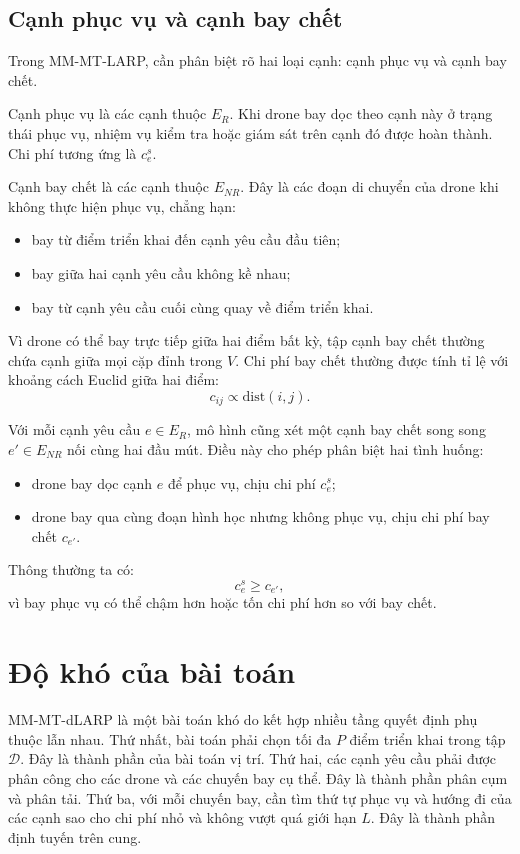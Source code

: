 \subsection{Cạnh phục vụ và cạnh bay chết}

Trong MM-MT-LARP, cần phân biệt rõ hai loại cạnh: cạnh phục vụ và cạnh bay chết.

Cạnh phục vụ là các cạnh thuộc $E_R$. Khi drone bay dọc theo cạnh này ở trạng thái phục vụ, nhiệm vụ kiểm tra hoặc giám sát trên cạnh đó được hoàn thành. Chi phí tương ứng là $c^s_e$.

Cạnh bay chết là các cạnh thuộc $E_{NR}$. Đây là các đoạn di chuyển của drone khi không thực hiện phục vụ, chẳng hạn:
\begin{itemize}
\item bay từ điểm triển khai đến cạnh yêu cầu đầu tiên;
\item bay giữa hai cạnh yêu cầu không kề nhau;
\item bay từ cạnh yêu cầu cuối cùng quay về điểm triển khai.
\end{itemize}

Vì drone có thể bay trực tiếp giữa hai điểm bất kỳ, tập cạnh bay chết thường chứa cạnh giữa mọi cặp đỉnh trong $V$. Chi phí bay chết thường được tính tỉ lệ với khoảng cách Euclid giữa hai điểm:
\begin{equation}
c_{ij} \propto \text{dist}(i,j).
\end{equation}

Với mỗi cạnh yêu cầu $e \in E_R$, mô hình cũng xét một cạnh bay chết song song $e' \in E_{NR}$ nối cùng hai đầu mút. Điều này cho phép phân biệt hai tình huống:
\begin{itemize}
\item drone bay dọc cạnh $e$ để phục vụ, chịu chi phí $c^s_e$;
\item drone bay qua cùng đoạn hình học nhưng không phục vụ, chịu chi phí bay chết $c_{e'}$.
\end{itemize}

Thông thường ta có:
\begin{equation}
c^s_e \geq c_{e'},
\end{equation}
vì bay phục vụ có thể chậm hơn hoặc tốn chi phí hơn so với bay chết.

\section{Độ khó của bài toán}

MM-MT-dLARP là một bài toán khó do kết hợp nhiều tầng quyết định phụ thuộc lẫn nhau. Thứ nhất, bài toán phải chọn tối đa $P$ điểm triển khai trong tập $\mathcal{D}$. Đây là thành phần của bài toán vị trí. Thứ hai, các cạnh yêu cầu phải được phân công cho các drone và các chuyến bay cụ thể. Đây là thành phần phân cụm và phân tải. Thứ ba, với mỗi chuyến bay, cần tìm thứ tự phục vụ và hướng đi của các cạnh sao cho chi phí nhỏ và không vượt quá giới hạn $L$. Đây là thành phần định tuyến trên cung.

